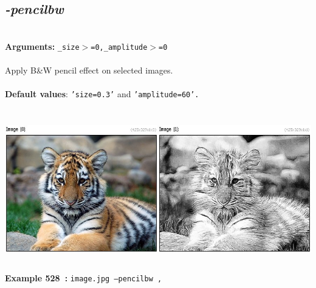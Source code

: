 \documentclass[a4paper,11pt,twoside]{book}
\begin{document}
\subsection{\emph{-pencilbw} }\vspace*{-0.5em}
~\\\textbf{Arguments: } 
{\small \texttt{\_size$>$=0,\_amplitude$>$=0}}\\~\\
Apply B\&W pencil effect on selected images.
~\\~\\\textbf{Default values}: {\small \texttt{'size=0.3'} and \texttt{'amplitude=60'.}}
\begin{center}\includegraphics[keepaspectratio=true,height=7cm,width=\textwidth]{img/gmic_def528.jpg}\\
{\footnotesize \textbf{Example 528~:} \texttt{image.jpg --pencilbw ,}}
\end{center}
\end{document}
